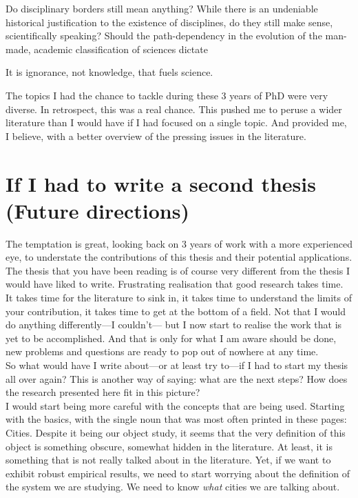 Do disciplinary borders still mean anything? While there is an undeniable
historical justification to the existence of disciplines, do they still make
sense, scientifically speaking? Should the path-dependency in the evolution of
the man-made, academic classification of sciences dictate 


It is ignorance, not knowledge, that fuels science.

The topics I had the chance to tackle during these 3 years of PhD were
very diverse. In retrospect, this was a real chance. This pushed me to peruse a
wider literature than I would have if I had focused on a single topic. And provided me,
I believe, with a better overview of the pressing issues in the literature.

\section{If I had to write a second thesis (Future directions)}
\label{sec:limitations}

The temptation is great, looking back on $3$ years of work with a more
experienced eye, to understate the contributions of this thesis and their
potential applications. The thesis that you have been reading is of course very
different from the thesis I would have liked to write. Frustrating realisation
that good research takes time. It takes time for the literature to sink in, it
takes time to understand the limits of your contribution, it takes time to get
at the bottom of a field. Not that I would do anything differently---I
couldn't--- but I now start to realise the work that is yet to be accomplished.
And that is only for what I am aware should be done, new problems and questions
are ready to pop out of nowhere at any time.\\

So what would have I write about---or at least try to---if I had to start my
thesis all over again? This is another way of saying: what are the next steps?
How does the research presented here fit in this picture?\\

I would start being more careful with the concepts that are being used. Starting
with the basics, with the single noun that was most often printed in these
pages: Cities. Despite it being our object study, it seems that the very
definition of this object is something obscure, somewhat hidden in the
literature. At least, it is something that is not really talked about in the
literature. Yet, if we want to exhibit robust empirical results, we need to
start worrying about the definition of the system we are studying. We need to
know \emph{what} cities we are talking about.\\


